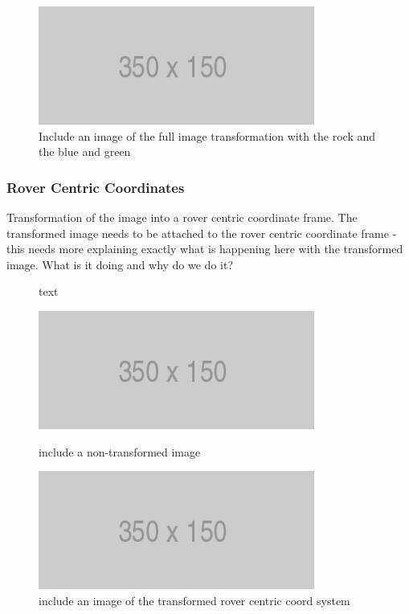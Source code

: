 \documentclass[a4paper]{article}
\begin{document}
\begin{figure}[]
\centering
\includegraphics[scale=0.5]{placeholder}
\caption{Include an image of the full image transformation with the rock and the blue and green}
\end{figure}

\subsubsection{Rover Centric Coordinates}
Transformation of the image into a rover centric coordinate frame. The transformed image needs to be attached to the rover centric coordinate frame - this needs more explaining exactly what is happening here with the transformed image. What is it doing and why do we do it?

\begin{figure}[h]\scriptsize
\begin{sexylisting}{text}

\end{sexylisting}
\end{figure}

\begin{figure}[h]
\centering
\begin{minipage}[t]{0.45\linewidth}
\centering
\includegraphics[scale=0.5]{placeholder}
\caption{include a non-transformed image}
\end{minipage}
\hspace{0.5cm}
\begin{minipage}[t]{0.45\linewidth}
\centering
\includegraphics[scale=0.5]{placeholder}
\caption{include an image of the transformed rover centric coord system}
\end{minipage}
\end{figure}
\end{document}
